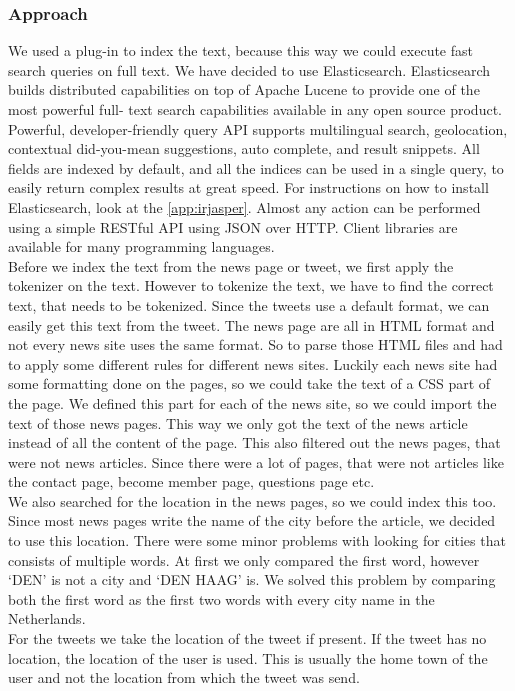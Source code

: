 \subsubsection*{Approach}
We used a plug-in to index the text, because this way we could execute fast search queries on full text. 
We have decided to use Elasticsearch. 
Elasticsearch builds distributed capabilities on top of Apache Lucene to provide one of the most powerful full- text search capabilities available in any open source product. 
Powerful, developer-friendly query API supports multilingual search, geolocation, contextual did-you-mean suggestions, auto complete, and result snippets.
All fields are indexed by default, and all the indices can be used in a single query, to easily return complex results at great speed.  
For instructions on how to install Elasticsearch, look at the  \autoref{app:irjasper}.
Almost any action can be performed using a simple RESTful API using JSON over HTTP. Client libraries are available for many programming languages.\\
Before we index the text from the news page or tweet, we first apply the tokenizer on the text.
However to tokenize the text, we have to find the correct text, that needs to be tokenized.
Since the tweets use a default format, we can easily get this text from the tweet. 
The news page are all in HTML format and not every news site uses the same format. 
So to parse those HTML files and had to apply some different rules for different news sites.
Luckily each news site had some formatting done on the pages, so we could take the text of a CSS part of the page. 
We defined this part for each of the news site, so we could import the text of those news pages.  
This way we only got the text of the news article instead of all the content of the page.
This also filtered out the news pages, that were not news articles. 
Since there were a lot of pages, that were not articles like the contact page, become member page, questions page etc.  \\
We also searched for the location in the news pages, so we could index this too. 
Since most news pages write the name of the city before the article, we decided to use this location.
There were some minor problems with looking for cities that consists of multiple words. 
At first we only compared the first word, however `DEN' is not a city and `DEN HAAG' is. 
We solved this problem by comparing both the first word as the first two words with every city name in the Netherlands. \\
 For the tweets we take the location of the tweet if present. 
If the tweet has no location, the location of the user is used. 
This is usually the home town of the user and not the location from which the tweet was send.\\ 

